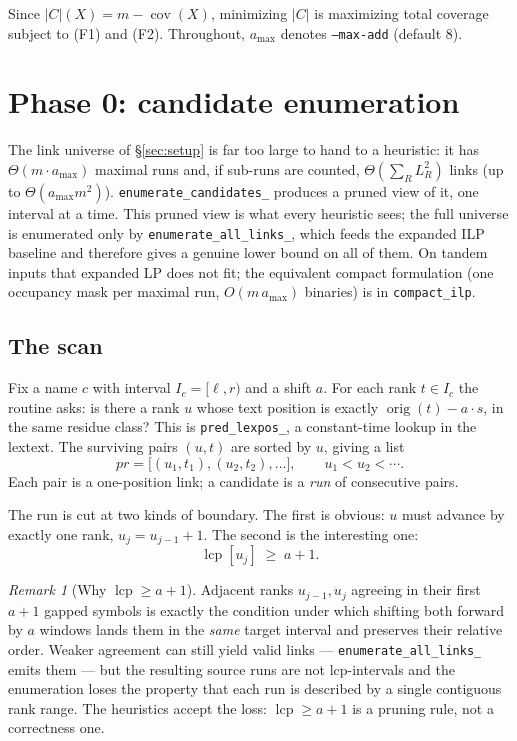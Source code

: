\documentclass[11pt,a4paper]{article}
\theoremstyle{definition}
\theoremstyle{plain}
\theoremstyle{remark}
\newtheorem{remark}{Remark}
\newcommand{\cov}{\operatorname{cov}}
\newcommand{\orig}{\operatorname{orig}}
\newcommand{\lcp}{\operatorname{lcp}}
\begin{document}
Since $|C|(X) = m - \cov(X)$, minimizing $|C|$ is maximizing total
coverage subject to (F1) and (F2). Throughout, $a_{\max}$ denotes
\texttt{--max-add} (default $8$).

\section{Phase 0: candidate enumeration}
\label{sec:enumerate}

The link universe of \S\ref{sec:setup} is far too large to hand to a
heuristic: it has $\Theta(m \cdot a_{\max})$ maximal runs and, if
sub-runs are counted, $\Theta(\sum_R L_R^2)$ links (up to
$\Theta(a_{\max} m^2)$). \texttt{enumerate\_candidates\_} produces a
pruned view of it, one interval at a time. This pruned view is what
every heuristic sees; the full universe is enumerated only by
\texttt{enumerate\_all\_links\_}, which feeds the expanded ILP baseline
and therefore gives a genuine lower bound on all of them. On tandem
inputs that expanded LP does not fit; the equivalent compact formulation
(one occupancy mask per maximal run, $O(m\,a_{\max})$ binaries) is in
\texttt{compact\_ilp}.

\subsection{The scan}

Fix a name $c$ with interval $I_c = [\ell, r)$ and a shift $a$. For each
rank $t \in I_c$ the routine asks: is there a rank $u$ whose text
position is exactly $\orig(t) - a\cdot s$, in the same residue class?
This is \texttt{pred\_lexpos\_}, a constant-time lookup in the lextext.
The surviving pairs $(u,t)$ are sorted by $u$, giving a list
\[
  \mathit{pr} = \bigl[(u_1,t_1), (u_2,t_2), \dots\bigr],
  \qquad u_1 < u_2 < \cdots .
\]
Each pair is a one-position link; a candidate is a \emph{run} of
consecutive pairs.

The run is cut at two kinds of boundary. The first is obvious: $u$ must
advance by exactly one rank, $u_{j} = u_{j-1} + 1$. The second is the
interesting one:
\[
  \lcp[u_j] \;\ge\; a+1 .
\]

\begin{remark}[Why $\lcp \ge a+1$]
\label{rem:lcp}
Adjacent ranks $u_{j-1}, u_j$ agreeing in their first $a+1$ gapped
symbols is exactly the condition under which shifting both forward by
$a$ windows lands them in the \emph{same} target interval and preserves
their relative order. Weaker agreement can still yield valid links ---
\texttt{enumerate\_all\_links\_} emits them --- but the resulting source
runs are not lcp-intervals and the enumeration loses the property that
each run is described by a single contiguous rank range. The heuristics
accept the loss: $\lcp \ge a+1$ is a pruning rule, not a correctness
one.
\end{remark}
\end{document}
